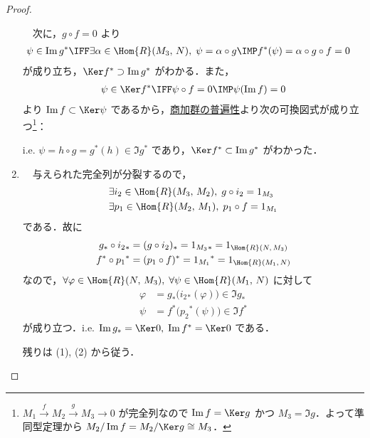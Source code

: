 \documentclass[algtopo_main]{subfiles}
\begin{document}
\begin{proof}
\begin{enumerate}
        　次に，$g \circ f = 0$ より
        \begin{align}
            \psi \in \Im g^* &\IFF \exists \alpha \in \Hom{R}(M_3,\, N),\; \psi = \alpha \circ g \IMP f^*(\psi) = \alpha \circ g \circ f = 0
        \end{align}
        が成り立ち，$\Ker f^* \supset \Im g^*$ がわかる．また，
        \begin{align}
            \psi \in \Ker f^* \IFF \psi \circ f = 0 \IMP \psi(\Im f) = 0
        \end{align}
        より $\Im f \subset\Ker \psi$ であるから，\hyperref[lem:fig:quomod-univ]{商加群の普遍性}より次の可換図式が成り立つ\footnote{$M_1 \xrightarrow{f} M_2 \xrightarrow{g} M_3 \to 0$ が完全列なので $\Im f = \Ker g$ かつ $M_3= \Im g$．よって準同型定理から $M_2/\Im f = M_2/\Ker g \cong M_3$．}：
        \begin{figure}[H]
            \centering
        \end{figure}%
        i.e. $\psi = h \circ g = g^*(h) \in \Im g^*$ であり，$\Ker f^* \subset \Im g^*$ がわかった．
        \item 　与えられた完全列が分裂するので，
        \begin{align}
            &\exists i_2 \in \Hom{R}(M_3,\,M_2),\; g \circ i_2 = 1_{M_3} \\
            &\exists p_1 \in \Hom{R}(M_2,\,M_1),\; p_1 \circ f = 1_{M_1}
        \end{align}
        である．故に
        \begin{align}
            g_* \circ i_2{}_* &= (g \circ i_2)_* = 1_{M_3}{}_* = 1_{\Hom{R}(N,\, M_3)} \\
            f^* \circ p_1{}^* &= (p_1 \circ f)^* = 1_{M_1}{}^* = 1_{\Hom{R}(M_1,\, N)}
        \end{align}
        なので，$\forall \varphi \in \Hom{R}(N,\, M_3),\; \forall \psi \in \Hom{R}(M_1,\, N)$ に対して
        \begin{align}
            \varphi &= g_* \bigl( i_2{}_*(\varphi) \bigr) \in \Im g_* \\
            \psi &= f^* \bigl( p_2{}^*(\psi) \bigr) \in \Im f^*
        \end{align}
        が成り立つ．i.e. $\Im g_* = \Ker 0,\; \Im f^* = \Ker 0$ である．

        残りは (1), (2) から従う．
    \end{enumerate}
    
\end{proof}
\end{document}
